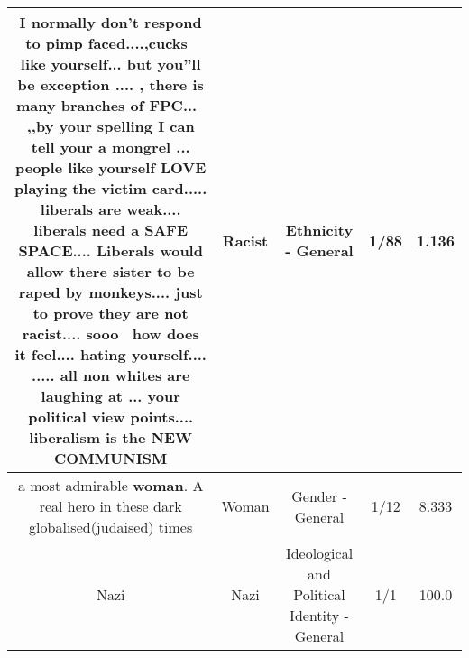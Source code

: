 \documentclass[11pt]{article}
\newlength\mylength
\begin{document}
\begin{center}
\begin{longtable}{|C{.65\mylength}|C{.30\mylength}|C{.12\mylength}|C{.12\mylength}|C{.12\mylength}|}
  \small I normally don't respond to pimp faced....,cucks  like yourself... but you''ll be exception .... , there is many branches of FPC...  ,,by your spelling I can tell your a mongrel ... people like yourself LOVE playing the victim card..... liberals are weak.... liberals need a SAFE SPACE.... Liberals would allow there sister to be raped by monkeys.... just to prove they are not \textbf{racist}.... sooo  how does it feel.... hating yourself.... ..... all non whites are laughing at ... your political view points.... liberalism is the NEW COMMUNISM\normalsize   & Racist & Ethnicity - General & 1/88 & 1.136 \\  \hline
  \small a most admirable \textbf{woman}. A real hero in these dark globalised(judaised) times\normalsize   & Woman & Gender - General & 1/12 & 8.333 \\  \hline
  \small Nazi\normalsize   & Nazi &  Ideological and Political Identity - General & 1/1 & 100.0 \\  \hline
  
\end{longtable}
\end{center}
\end{document}
